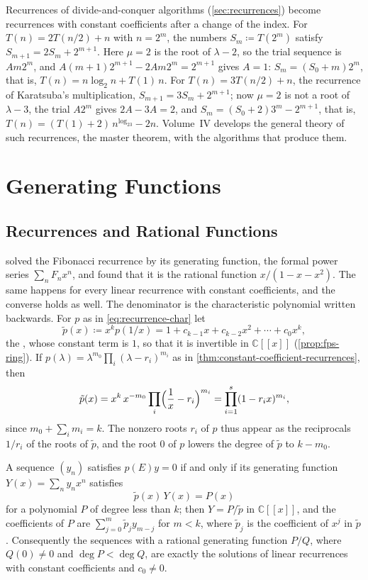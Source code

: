 Recurrences of divide-and-conquer algorithms (\cref{sec:recurrences}) become recurrences with constant coefficients after a change of the index. For $T(n)=2T(n/2)+n$ with $n=2^m$, the numbers $S_m\coloneqq T(2^m)$ satisfy $S_{m+1}=2S_m+2^{m+1}$. Here $\mu=2$ is the root of $\lambda-2$, so the trial sequence is $Am2^m$, and $A(m+1)2^{m+1}-2Am2^m=2^{m+1}$ gives $A=1$: $S_m=(S_0+m)2^m$, that is, $T(n)=n\log_2n+T(1)\,n$. For $T(n)=3T(n/2)+n$, the recurrence of Karatsuba's multiplication, $S_{m+1}=3S_m+2^{m+1}$; now $\mu=2$ is not a root of $\lambda-3$, the trial $A2^m$ gives $2A-3A=2$, and $S_m=(S_0+2)3^m-2^{m+1}$, that is, $T(n)=(T(1)+2)\,n^{\log_23}-2n$. Volume~IV develops the general theory of such recurrences, the master theorem, with the algorithms that produce them.

\section{Generating Functions}
\label{sec:recurrence-gf}

\subsection{Recurrences and Rational Functions}

 solved the Fibonacci recurrence by its generating function, the formal power series $\sum_nF_nx^n$, and found that it is the rational function $x/(1-x-x^2)$. The same happens for every linear recurrence with constant coefficients, and the converse holds as well. The denominator is the characteristic polynomial written backwards. For $p$ as in \eqref{eq:recurrence-char} let
\[
\tilde p(x)\coloneqq x^kp(1/x)=1+c_{k-1}x+c_{k-2}x^2+\cdots+c_0x^k ,
\]
the , whose constant term is $1$, so that it is invertible in $\mathbb C[[x]]$ (\cref{prop:fps-ring}). If $p(\lambda)=\lambda^{m_0}\prod_i(\lambda-r_i)^{m_i}$ as in \cref{thm:constant-coefficient-recurrences}, then
\begin{equation}
\tilde p(x)=x^k\,x^{-m_0}\prod_i\Bigl(\frac1x-r_i\Bigr)^{m_i}=\prod_{i=1}^s(1-r_ix)^{m_i},
\label{eq:reversed-factorisation}
\end{equation}
since $m_0+\sum_im_i=k$. The nonzero roots $r_i$ of $p$ thus appear as the reciprocals $1/r_i$ of the roots of $\tilde p$, and the root $0$ of $p$ lowers the degree of $\tilde p$ to $k-m_0$.

\begin{theorem}
\label{thm:rational-gf}
A sequence $(y_n)$ satisfies $p(E)y=0$ if and only if its generating function $Y(x)=\sum_ny_nx^n$ satisfies
\[
\tilde p(x)\,Y(x)=P(x)
\]
for a polynomial $P$ of degree less than $k$; then $Y=P/\tilde p$ in $\mathbb C[[x]]$, and the coefficients of $P$ are $\sum_{j=0}^m\tilde p_jy_{m-j}$ for $m<k$, where $\tilde p_j$ is the coefficient of $x^j$ in $\tilde p$. Consequently the sequences with a rational generating function $P/Q$, where $Q(0)\ne0$ and $\deg P<\deg Q$, are exactly the solutions of linear recurrences with constant coefficients and $c_0\ne0$.
\end{theorem}

